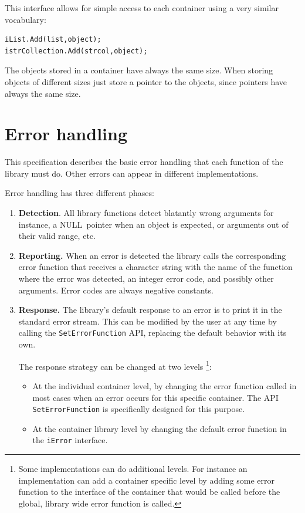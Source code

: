 \documentclass[12pt,a4paper]{memoir} %
\newif\iftth
\newenvironment{ShorterItemize}{
\begin{itemize}
\iftth\else
  \setlength{\itemsep}{1pt}
  \setlength{\parskip}{0pt}
  \setlength{\parsep}{0pt}
\fi
}{\end{itemize}
}
\newcommand{\Null}{{\iftth \ NULL \else \footnotesize NULL\  \fi}}
\begin{document}
This interface allows for simple access to each container using a very similar vocabulary:
\begin{verbatim}
iList.Add(list,object);
istrCollection.Add(strcol,object);
\end{verbatim}
The objects stored in a container have always the same size. When storing objects of different sizes just store a pointer to the objects, since pointers have always the same size.
\section{Error handling}
This specification describes the basic error handling that each function of the library must do. Other errors can appear in different implementations.

Error handling has three different phases:
\begin{enumerate}
\item \textbf{Detection}. All library functions detect blatantly wrong arguments for instance, a \Null pointer when an object is expected, or arguments out of their valid range, etc.
\item \textbf{Reporting.} When an error is detected the library calls the corresponding error function that receives a character string with the name of the 
function where the error was detected, an integer error code, and possibly other arguments. Error codes are always negative constants.
\item \textbf{Response.} The library's default response to an error is to print it in the standard error stream. This can be modified by the user at any time by calling the \texttt{SetErrorFunction} API, replacing the default behavior with its own.

The response strategy can be changed at two levels \footnote
{Some implementations can do additional levels. For instance an implementation can add a container specific level by adding some error function
to the interface of the container that would be called before the global, library wide error function is called.}:
\begin{ShorterItemize}
\item At the individual container level, by changing the error function called in  most cases when an error occurs for this specific container. The
API \verb,SetErrorFunction, is specifically designed for this purpose.
\item At the container library level by changing the default error function in the \verb,iError, interface.
\end{ShorterItemize}

\end{enumerate}
\end{document}
